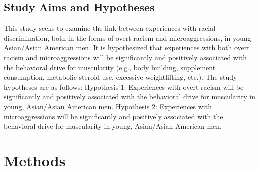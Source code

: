 \documentclass[
  english,
  man, fleqn, noextraspace,floatsintext]{apa6}
\begin{document}
\hypertarget{study-aims-and-hypotheses}{%
\subsection{Study Aims and Hypotheses}\label{study-aims-and-hypotheses}}

This study seeks to examine the link between experiences with racial discrimination, both in the forms of overt racism and microaggressions, in young Asian/Asian American men. It is hypothesized that experiences with both overt racism and microaggressions will be significantly and positively associated with the behavioral drive for muscularity (e.g., body building, supplement consumption, metabolic steroid use, excessive weightlifting, etc.). The study hypotheses are as follows:
Hypothesis 1: Experiences with overt racism will be significantly and positively associated with the behavioral drive for muscularity in young, Asian/Asian American men.
Hypothesis 2: Experiences with microaggressions will be significantly and positively associated with the behavioral drive for muscularity in young, Asian/Asian American men.

\hypertarget{methods}{%
\section{Methods}\label{methods}}
\end{document}
